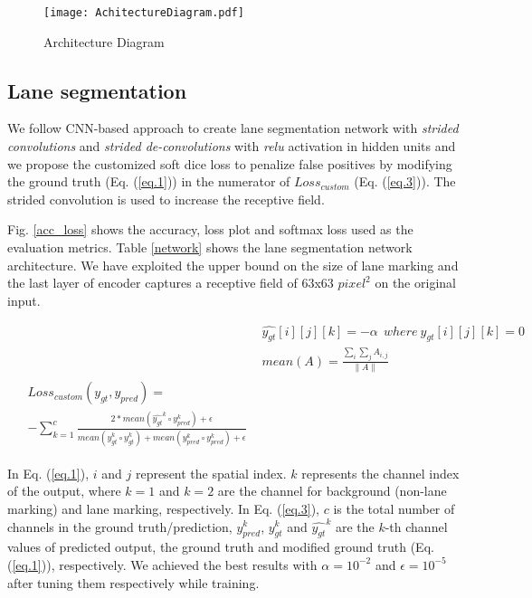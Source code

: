 \documentclass[fleqn,10pt,twocolumn]{ICCAS2019}
\begin{document}
\begin{figure}[thb]
\begin{center}
\texttt{[image: AchitectureDiagram.pdf]}
\caption{Architecture Diagram}
\label{fig:architecture}
\end{center}
\end{figure}

\subsection{Lane segmentation}

We follow CNN-based approach \cite{imagenet} to create lane segmentation network with \textit{strided convolutions} and \textit{strided de-convolutions} with \textit{relu} \cite{relu} activation in hidden units and we propose the customized soft dice loss \cite{diceloss} to penalize false positives by modifying the ground truth (Eq. (\ref{eq.1})) in the numerator of $Loss_{custom}$ (Eq. (\ref{eq.3})). The strided convolution is used to increase the receptive field.

Fig. \ref{acc_loss} shows the accuracy, loss plot and softmax loss used as the evaluation metrics. Table \ref{network} shows the lane segmentation network architecture. We have exploited the upper bound on the size of lane marking and the last layer of encoder captures a receptive field of $63$x$63$ $pixel^{2}$ on the original input.

\begin{align}
&\hat{y_{gt}}[i][j][k] = -\alpha~~where~y_{gt}[i][j][k] = 0 \label{eq.1} \\
&mean(A) = \frac{\sum_{i}\sum_{j}A_{i,j}}{\|A\|} \label{eq.2}\\
\begin{split}
&Loss_{custom}(y_{gt}, y_{pred}) = \\ 
&- \sum_{k=1}^{c}\frac{2*mean(\hat{y_{gt}}^{k}\circ y_{pred}^{k}) + \epsilon}{mean(y_{gt}^{k}\circ y_{gt}^{k})+mean(y_{pred}^{k}\circ y_{pred}^{k}) +\epsilon}
\label{eq.3}
\end{split}
\end{align}

In Eq. (\ref{eq.1}), $i$ and $j$ represent the spatial index. $k$ represents the channel index of the output, where $k=1$ and $k=2$ are the channel for background (non-lane marking) and lane marking, respectively. In Eq. (\ref{eq.3}), $c$ is the total number of channels in the ground truth/prediction, $y_{pred}^{k}$, $y_{gt}^{k}$ and $\hat{y_{gt}}^{k}$ are the $k$-th channel values of predicted output, the ground truth and modified ground truth (Eq. (\ref{eq.1})), respectively. We achieved the best results with $\alpha=10^{-2}$ and $\epsilon=10^{-5}$ after tuning them respectively while training.
\end{document}
